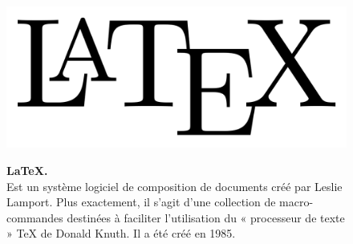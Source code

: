 \begin{figure}[H]
    \centering
    \begin{minipage}[c]{0.3\textwidth}
        \includegraphics[width=\linewidth]{projet/images/diagramme de sequance/images/latex.png}
    \end{minipage}
    \hspace{1cm}
    \begin{minipage}[c]{0.6\textwidth}
        \textbf{LaTeX.}\\[0.5em]
        Est un système logiciel de composition de documents créé par Leslie Lamport. Plus exactement, il s'agit d'une collection de macro-commandes destinées à faciliter l'utilisation du « processeur de texte » TeX de Donald Knuth. Il a été créé en 1985. \cite{ref12}
    \end{minipage}
\end{figure}

